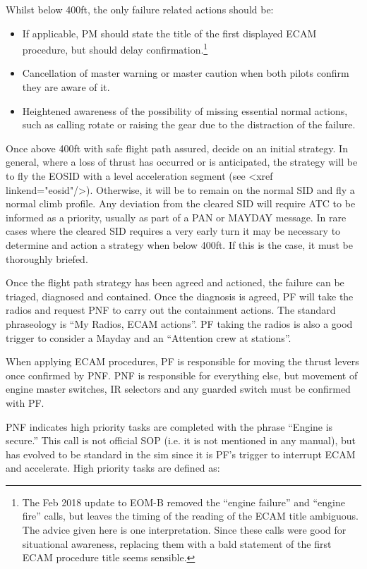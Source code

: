 \documentclass[a5paper,11pt,twoside]{book}
\begin{document}
Whilst below 400ft, the only failure related actions should be:
\begin{itemize}
\item If applicable, PM should state the title of the first displayed ECAM
  procedure, but should delay confirmation.\footnote{ The Feb 2018 update to
  EOM-B removed the ``engine failure'' and ``engine fire'' calls, but leaves the
  timing of the reading of the ECAM title ambiguous. The advice given here is
  one interpretation. Since these calls were good for situational awareness,
  replacing them with a bald statement of the first ECAM procedure title seems
  sensible.}

\item Cancellation of master warning or master caution when both pilots confirm
  they are aware of it.

\item Heightened awareness of the possibility of missing essential normal
  actions, such as calling rotate or raising the gear due to the distraction of
  the failure.
\end{itemize}


Once above 400ft with safe flight path assured, decide on an initial
strategy. In general, where a loss of thrust has occurred or is anticipated, the
strategy will be to fly the EOSID with a level acceleration segment (see <xref
linkend="eosid"/>). Otherwise, it will be to remain on the normal SID and fly a
normal climb profile. Any deviation from the cleared SID will require ATC to be
informed as a priority, usually as part of a PAN or MAYDAY message. In rare
cases where the cleared SID requires a very early turn it may be necessary to
determine and action a strategy when below 400ft. If this is the case, it must
be thoroughly briefed.

Once the flight path strategy has been agreed and actioned, the failure can be
triaged, diagnosed and contained. Once the diagnosis is agreed, PF will take the
radios and request PNF to carry out the containment actions. The standard
phraseology is ``My Radios, ECAM actions''. PF taking the radios is also a good
trigger to consider a Mayday and an ``Attention crew at stations''.

When applying ECAM procedures, PF is responsible for moving the thrust levers
once confirmed by PNF. PNF is responsible for everything else, but movement of
engine master switches, IR selectors and any guarded switch must be confirmed
with PF.

PNF indicates high priority tasks are completed with the phrase ``Engine is
secure.''  This call is not official SOP (i.e. it is not mentioned in any
manual), but has evolved to be standard in the sim since it is PF's trigger to
interrupt ECAM and accelerate.  High priority tasks are defined as:
\end{document}
